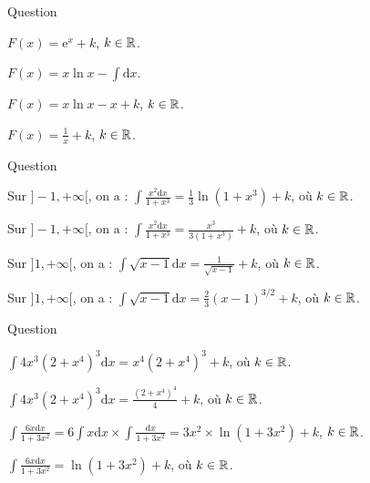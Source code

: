 \begin{multi}[multiple,feedback=
{Une intégration par parties avec \(u=\ln x\) et \(v=x\) donne
\[\int \ln x\mathrm{d}x=x\ln x-\int \mathrm{d}x=x\ln x-x+k,\; k\in \Rr.\]
}]{Question}
    \item \(\displaystyle F(x)=\mathrm{e}^{x}+k\), \(k\in \mathbb{R}\).
    \item* \(\displaystyle F(x)=x\ln x-\int \mathrm{d}x\).
    \item* \(\displaystyle F(x)=x\ln x-x+k\), \(k\in \mathbb{R}\).
    \item \(\displaystyle F(x)=\frac{1}{x}+k\), \(k\in \mathbb{R}\).
\end{multi}


\begin{multi}[multiple,feedback=
{Avec \(u=1+x^3\), on a : \(\mathrm{d}u=3x^2\mathrm{d}x\) et
\[\int \frac{x^2\mathrm{d}x}{1+x^3}=\frac{1}{3}\int \frac{\mathrm{d}u}{u}=\frac{1}{3}\ln |u|+k=\frac{1}{3}\ln (1+x^3)+k,\; k\in \Rr.\]
De m\^eme, avec \(u=x-1\), on a \(\mathrm{d}u=\mathrm{d}x\) et
\[\int \sqrt{x-1}\mathrm{d}x=\int \sqrt{u}\mathrm{d}u=\frac{2}{3}u^{3/2}+k=\frac{2}{3}(x-1)^{3/2}+k,\; k\in \Rr.\]
}]{Question}
    \item* Sur \(]-1,+\infty[\), on a : \(\displaystyle \int \frac{x^2\mathrm{d}x}{1+x^3}=\frac{1}{3}\ln (1+x^3)+k\), où \(k\in \mathbb{R}\).
    \item Sur \(]-1,+\infty[\), on a : \(\displaystyle \int \frac{x^2\mathrm{d}x}{1+x^3}=\frac{x^3}{3(1+x^3)}+k\), où \(k\in \mathbb{R}\).
    \item Sur \(]1,+\infty[\), on a : \(\displaystyle \int \sqrt{x-1}\mathrm{d}x=\frac{1}{\sqrt{x-1}}+k\), où \(k\in \mathbb{R}\).
    \item* Sur \(]1,+\infty[\), on a : \(\displaystyle \int \sqrt{x-1}\mathrm{d}x=\frac{2}{3}(x-1)^{3/2}+k\), où \(k\in \mathbb{R}\).
\end{multi}


\begin{multi}[multiple,feedback=
{Avec \(u=2+x^4\), on a : \(\mathrm{d}u=4x^3\mathrm{d}x\) et
\[\int 4x^3(2+x^4)^3\mathrm{d}x=\int u^3\mathrm{d}u=\frac{u^4}{4}+k=\frac{(2+x^4)^4}{4}+k,\; k\in \Rr.\]
De m\^eme, avec \(u=1+3x^2\), on a : \(\mathrm{d}u=6x\mathrm{d}x\) et
\[\int \frac{6x\mathrm{d}x}{1+3x^2}=\int \frac{\mathrm{d}u}{u}=\ln (u)+k=\ln(1+3x^2)+k,\; k\in \Rr.\]
}]{Question}
    \item \(\displaystyle \int 4x^3(2+x^4)^3\mathrm{d}x=x^4(2+x^4)^3+k\), où \(k\in \mathbb{R}\).
    \item* \(\displaystyle \int 4x^3(2+x^4)^3\mathrm{d}x=\frac{(2+x^4)^4}{4}+k\), où \(k\in \mathbb{R}\).
    \item \(\displaystyle \int \frac{6x\mathrm{d}x}{1+3x^2}=6\int x\mathrm{d}x\times\int \frac{\mathrm{d}x}{1+3x^2}=3x^2\times\ln (1+3x^2)+k\), \(k\in \mathbb{R}\).
    \item* \(\displaystyle \int \frac{6x\mathrm{d}x}{1+3x^2}=\ln(1+3x^2)+k\), où \(k\in \mathbb{R}\).
\end{multi}



